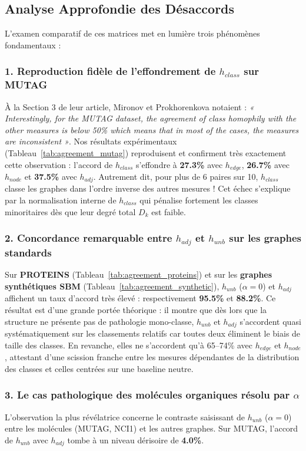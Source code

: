 \documentclass[11pt,a4paper]{article}
\begin{document}
\subsection{Analyse Approfondie des Désaccords}

L'examen comparatif de ces matrices met en lumière trois phénomènes fondamentaux :

\subsubsection{1. Reproduction fidèle de l'effondrement de $h_{class}$ sur MUTAG}
À la Section 3 de leur article, Mironov et Prokhorenkova notaient : \textit{« Interestingly, for the MUTAG dataset, the agreement of class homophily with the other measures is below 50\% which means that in most of the cases, the measures are inconsistent »}.
Nos résultats expérimentaux (Tableau~\ref{tab:agreement_mutag}) reproduisent et confirment très exactement cette observation : l'accord de $h_{class}$ s'effondre à \textbf{27.3\%} avec $h_{edge}$, \textbf{26.7\%} avec $h_{node}$ et \textbf{37.5\%} avec $h_{adj}$. Autrement dit, pour plus de 6 paires sur 10, $h_{class}$ classe les graphes dans l'ordre inverse des autres mesures ! Cet échec s'explique par la normalisation interne de $h_{class}$ qui pénalise fortement les classes minoritaires dès que leur degré total $D_k$ est faible.

\subsubsection{2. Concordance remarquable entre $h_{adj}$ et $h_{unb}$ sur les graphes standards}
Sur \textbf{PROTEINS} (Tableau~\ref{tab:agreement_proteins}) et sur les \textbf{graphes synthétiques SBM} (Tableau~\ref{tab:agreement_synthetic}), $h_{unb}$ ($\alpha=0$) et $h_{adj}$ affichent un taux d'accord très élevé : respectivement \textbf{95.5\%} et \textbf{88.2\%}. 
Ce résultat est d'une grande portée théorique : il montre que dès lors que la structure ne présente pas de pathologie mono-classe, $h_{unb}$ et $h_{adj}$ s'accordent quasi systématiquement sur les classements relatifs car toutes deux éliminent le biais de taille des classes. En revanche, elles ne s'accordent qu'à 65--74\% avec $h_{edge}$ et $h_{node}$, attestant d'une scission franche entre les mesures dépendantes de la distribution des classes et celles centrées sur une baseline neutre.

\subsubsection{3. Le cas pathologique des molécules organiques résolu par $\alpha$}
\label{sec:pathological}
L'observation la plus révélatrice concerne le contraste saisissant de $h_{unb}$ ($\alpha=0$) entre les molécules (MUTAG, NCI1) et les autres graphes. Sur MUTAG, l'accord de $h_{unb}$ avec $h_{adj}$ tombe à un niveau dérisoire de \textbf{4.0\%}.
\end{document}
